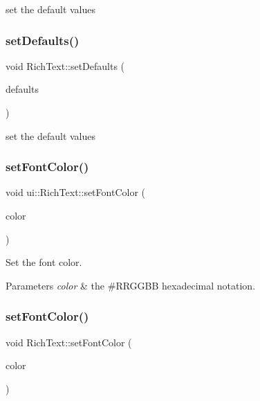 set the default values \mbox{\label{classui_1_1RichText_afa1a22d29820f1174ad61b2a65f24211}} 
\subsubsection{\texorpdfstring{set\+Defaults()}{setDefaults()}\hspace{0.1cm}{\footnotesize\ttfamily [2/2]}}
{\footnotesize\ttfamily void Rich\+Text\+::set\+Defaults (\begin{DoxyParamCaption}\item[{const Value\+Map \&}]{defaults }\end{DoxyParamCaption})}

set the default values \mbox{\label{classui_1_1RichText_afed903a1b6a5c8f96615f22b644c2bbd}} 
\subsubsection{\texorpdfstring{set\+Font\+Color()}{setFontColor()}\hspace{0.1cm}{\footnotesize\ttfamily [1/2]}}
{\footnotesize\ttfamily void ui\+::\+Rich\+Text\+::set\+Font\+Color (\begin{DoxyParamCaption}\item[{const std\+::string \&}]{color }\end{DoxyParamCaption})}

Set the font color. 
\begin{DoxyParams}{Parameters}
{\em color} & the \#\+R\+R\+G\+G\+BB hexadecimal notation. \\
\hline
\end{DoxyParams}
\mbox{\label{classui_1_1RichText_a5cd519c793200b5aaccfdb0fa8892e9a}} 
\subsubsection{\texorpdfstring{set\+Font\+Color()}{setFontColor()}\hspace{0.1cm}{\footnotesize\ttfamily [2/2]}}
{\footnotesize\ttfamily void Rich\+Text\+::set\+Font\+Color (\begin{DoxyParamCaption}\item[{const std\+::string \&}]{color }\end{DoxyParamCaption})}


